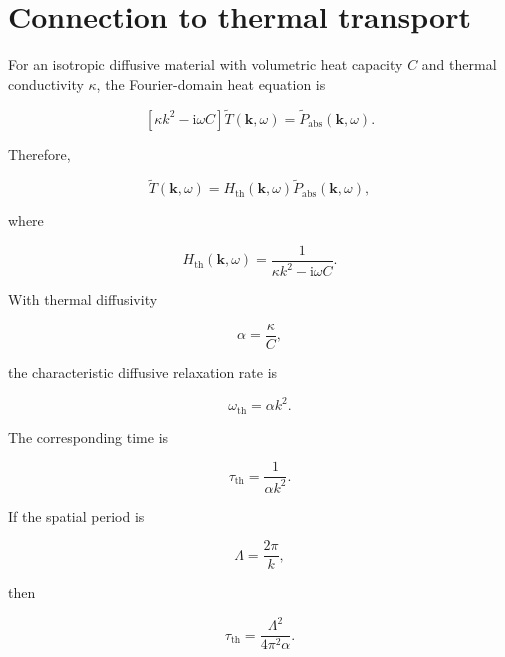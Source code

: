 \documentclass[11pt]{article}
\newcommand{\ii}{\mathrm{i}}
\newcommand{\kvec}{\mathbf{k}}
\begin{document}
\section{Connection to thermal transport}

For an isotropic diffusive material with volumetric heat capacity $C$ and
thermal conductivity $\kappa$, the Fourier-domain heat equation is

\begin{equation}
    \left[
        \kappa k^2
        -
        \ii\omega C
    \right]
    \widetilde{T}(\kvec,\omega)
    =
    \widetilde{P}_{\mathrm{abs}}(\kvec,\omega).
\end{equation}

Therefore,

\begin{equation}
\boxed{
    \widetilde{T}(\kvec,\omega)
    =
    H_{\mathrm{th}}(\kvec,\omega)
    \widetilde{P}_{\mathrm{abs}}(\kvec,\omega),
}
\end{equation}

where

\begin{equation}
\boxed{
    H_{\mathrm{th}}(\kvec,\omega)
    =
    \frac{1}{
        \kappa k^2-\ii\omega C
    }.
}
\end{equation}

With thermal diffusivity

\begin{equation}
    \alpha=\frac{\kappa}{C},
\end{equation}

the characteristic diffusive relaxation rate is

\begin{equation}
    \omega_{\mathrm{th}}=\alpha k^2.
\end{equation}

The corresponding time is

\begin{equation}
    \tau_{\mathrm{th}}=\frac{1}{\alpha k^2}.
\end{equation}

If the spatial period is

\begin{equation}
    \Lambda=\frac{2\pi}{k},
\end{equation}

then

\begin{equation}
    \tau_{\mathrm{th}}
    =
    \frac{\Lambda^2}{
        4\pi^2\alpha
    }.
\end{equation}
\end{document}
